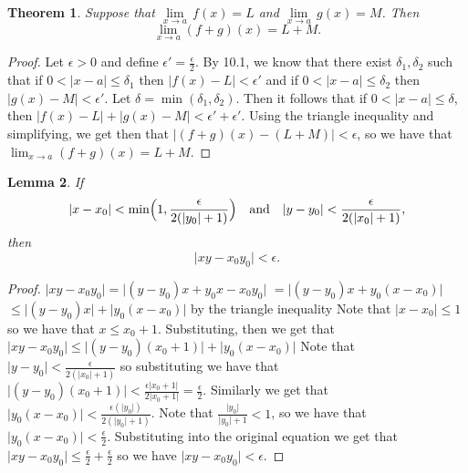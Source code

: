 \documentclass[12pt]{article}
\providecommand{\abs}[1]{\lvert #1 \rvert}
\providecommand{\sarr}{\rightarrow}
\renewcommand{\_}[1]{\underline{ #1 }}
\newtheorem{theorem}{Theorem}[section]
\newtheorem{lemma}[theorem]{Lemma}
\theoremstyle{definition}
\numberwithin{equation}{subsection}
\begin{document}
\begin{theorem}  Suppose that $\underset{x \sarr a}{\lim} \, f(x) = L$ and $\underset{x \sarr a}{\lim} \, g(x) = M$.  Then
\[
\lim_{x \sarr a} (f + g)(x) = L + M.
\]
\end{theorem}

\begin{proof}
Let $\epsilon > 0$ and define $\epsilon' = \frac{\epsilon}{2}$. By 10.1, we know that there exist $\delta_1, \delta_2$ such that if $0 < \abs{x - a} \leq \delta_1$ then $\abs{f(x) - L} < \epsilon'$ and if $0 < \abs{x - a} \leq \delta_2$ then $\abs{g(x) - M} < \epsilon'$. Let $\delta = \min(\delta_1, \delta_2)$. Then it follows that if $0 < \abs{x - a} \leq \delta$, then $\abs{f(x) - L} + \abs{g(x) - M} < \epsilon' + \epsilon'$. Using the triangle inequality and simplifying, we get then that $\abs{(f + g)(x) - (L + M)} < \epsilon$, so we have that $\lim_{x \sarr a} (f + g)(x) = L + M$.
\end{proof}

\begin{lemma} If
\[
\abs{x - x_0} < \min \Bigl( 1, \frac{\epsilon}{2(\abs{y_0} + 1)} \Bigr) \quad \text{and} \quad \abs{y - y_0} < \frac{\epsilon}{2 (\abs{x_0} + 1)},
\]
then
\[
\abs{xy - x_0 y_0} < \epsilon.
\]
\end{lemma}

\begin{proof}
$\abs{xy - x_0y_0} = \abs{(y - y_0)x + y_0x - x_0y_0}$ \newline
$= \abs{(y - y_0)x + y_0(x - x_0)}$ \newline
$\leq \abs{(y - y_0)x} + \abs{y_0(x - x_0)}$ by the triangle inequality \newline
Note that $\abs{x - x_0} \leq 1$ so we have that $x \leq x_0 + 1$. \newline
Substituting, then we get that $\abs{xy - x_0y_0} \leq \abs{(y-y_0)(x_0+1)} + \abs{y_0(x-x_0)}$ \newline
Note that $\abs{y - y_0} < \frac{\epsilon}{2(\abs{x_0} + 1)}$ so substituting we have that $\abs{(y-y_0)(x_0+1)} < \frac{\epsilon \abs{x_0 + 1}}{2 \abs{x_0+1}} = \frac{\epsilon}{2}$. \newline
Similarly we get that $\abs{y_0(x-x_0)} < \frac{\epsilon(\abs{y_0})}{2(\abs{y_0} + 1)}$. \newline
Note that $\frac{\abs{y_0}}{\abs{y_0} + 1} < 1$, so we have that $\abs{y_0(x-x_0)} < \frac{\epsilon}{2}$.
Substituting into the original equation we get that $\abs{xy - x_0y_0} \leq \frac{\epsilon}{2} + \frac{\epsilon}{2}$ so we have $\abs{xy - x_0y_0} < \epsilon$.
\end{proof}
\end{document}
